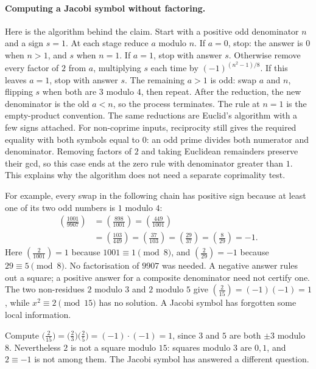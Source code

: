 \paragraph{Computing a Jacobi symbol without factoring.}
Here is the algorithm behind the claim. Start with a positive odd denominator
$n$ and a sign $s=1$. At each stage reduce $a$ modulo $n$. If $a=0$, stop:
the answer is $0$ when $n>1$, and $s$ when $n=1$. If $a=1$, stop with
answer $s$. Otherwise remove every factor of $2$ from $a$, multiplying $s$
each time by $(-1)^{(n^2-1)/8}$. If this leaves $a=1$, stop with answer
$s$. The remaining $a>1$ is odd: swap $a$ and $n$, flipping $s$ when both
are $3$ modulo $4$, then repeat. After the reduction, the new denominator
is the old $a<n$, so the process terminates. The rule at $n=1$ is the
empty-product convention. The same reductions are Euclid's algorithm with
a few signs attached.
For non-coprime inputs, reciprocity still gives the required equality with
both symbols equal to $0$: an odd prime divides both numerator and denominator.
Removing factors of $2$ and taking Euclidean remainders preserve their gcd,
so this case ends at the zero rule with denominator greater than $1$.
This explains why the algorithm does not need a separate coprimality test.

For example, every swap in the following chain has positive sign because
at least one of its two odd numbers is $1$ modulo $4$:
\[
\begin{aligned}
\left(\frac{1001}{9907}\right)
 &=\left(\frac{898}{1001}\right)
 =\left(\frac{449}{1001}\right)\\
 &=\left(\frac{103}{449}\right)
 =\left(\frac{37}{103}\right)
 =\left(\frac{29}{37}\right)
 =\left(\frac8{29}\right)=-1.
\end{aligned}
\]
Here $\left(\frac2{1001}\right)=1$ because $1001\equiv1\pmod8$,
and $\left(\frac2{29}\right)=-1$ because $29\equiv5\pmod8$.
No factorisation of $9907$ was needed. A negative answer rules out a square;
a positive answer for a composite denominator need not certify one. The two
non-residues $2$ modulo $3$ and $2$ modulo $5$ give
$\left(\frac2{15}\right)=(-1)(-1)=1$, while $x^2\equiv2\pmod{15}$ has
no solution. A Jacobi symbol has forgotten some local information.

\begin{examplex}
Compute $\bigl(\frac{2}{15}\bigr)=\bigl(\frac{2}{3}\bigr)\bigl(\frac{2}{5}\bigr)=(-1)\cdot(-1)=1$, since $3$ and $5$ are both $\pm 3$ modulo $8$.
Nevertheless $2$ is not a square modulo $15$: squares modulo $3$ are $0,1$, and $2\equiv -1$ is not among them. The Jacobi symbol has answered a different question.
\end{examplex}

